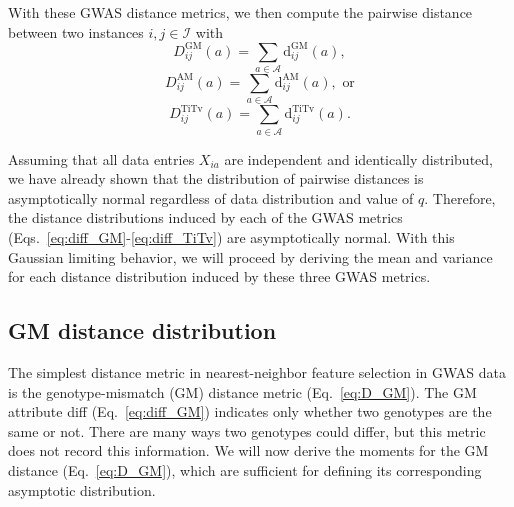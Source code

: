 \documentclass[aoas]{imsart}
\begin{document}
With these GWAS distance metrics, we then compute the pairwise distance between two instances $i,j \in \mathcal{I}$ with
%
\begin{equation}\label{eq:D_GM}
D^\text{GM}_{ij}(a) = \sum_{a \in \mathcal{A}} \text{d}^\text{GM}_{ij}(a),
\end{equation}
%
\begin{equation}\label{eq:D_AM}
D^\text{AM}_{ij}(a) = \sum_{a \in \mathcal{A}} \text{d}^\text{AM}_{ij}(a), \text{ or}
\end{equation}
%
\begin{equation}\label{eq:D_TiTv}
D^\text{TiTv}_{ij}(a) = \sum_{a \in \mathcal{A}} \text{d}^\text{TiTv}_{ij}(a).
\end{equation}

Assuming that all data entries $X_{ia}$ are independent and identically distributed, we have already shown that the distribution of pairwise distances is asymptotically normal regardless of data distribution and value of $q$. Therefore, the distance distributions induced by each of the GWAS metrics (Eqs.~\ref{eq:diff_GM}-\ref{eq:diff_TiTv}) are asymptotically normal. With this Gaussian limiting behavior, we will proceed by deriving the mean and variance for each distance distribution induced by these three GWAS metrics. 

\subsection{GM distance distribution}

The simplest distance metric in nearest-neighbor feature selection in GWAS data is the genotype-mismatch (GM) distance metric (Eq.~\ref{eq:D_GM}). The GM attribute diff (Eq.~\ref{eq:diff_GM}) indicates only whether two genotypes are the same or not. There are many ways two genotypes could differ, but this metric does not record this information. We will now derive the moments for the GM distance (Eq.~\ref{eq:D_GM}), which are sufficient for defining its corresponding asymptotic distribution.
\end{document}
